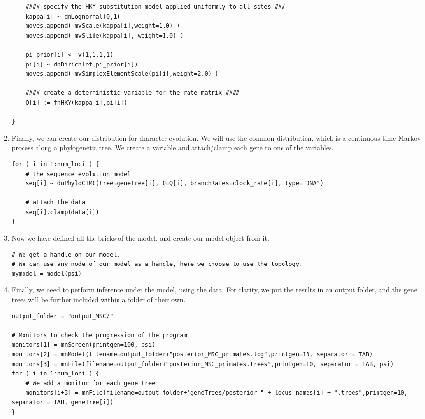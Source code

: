 \begin{enumerate}
{\begin{snugshade*}
\begin{lstlisting}
    #### specify the HKY substitution model applied uniformly to all sites ###
    kappa[i] ~ dnLognormal(0,1)
    moves.append( mvScale(kappa[i],weight=1.0) )
    moves.append( mvSlide(kappa[i], weight=1.0) )

    pi_prior[i] <- v(1,1,1,1)
    pi[i] ~ dnDirichlet(pi_prior[i])
    moves.append( mvSimplexElementScale(pi[i],weight=2.0) )

    #### create a deterministic variable for the rate matrix ####
    Q[i] := fnHKY(kappa[i],pi[i])

}

\end{lstlisting}
\end{snugshade*}}


\item Finally, we can create our distribution for character evolution.
We will use the common  distribution, which is a continuous time Markov process along a phylogenetic tree.
We create a  variable and attach/clamp each gene to one of the  variables.
{\tt \begin{snugshade*}
\begin{lstlisting}
for ( i in 1:num_loci ) {
    # the sequence evolution model
    seq[i] ~ dnPhyloCTMC(tree=geneTree[i], Q=Q[i], branchRates=clock_rate[i], type="DNA")

    # attach the data
    seq[i].clamp(data[i])
}
\end{lstlisting}
\end{snugshade*}}


\item Now we have defined all the bricks of the model, and create our model object from it.
{\tt \begin{snugshade*}
\begin{lstlisting}
# We get a handle on our model.
# We can use any node of our model as a handle, here we choose to use the topology.
mymodel = model(psi)
\end{lstlisting}
\end{snugshade*}}


\item Finally, we need to perform inference under the model, using the data.
For clarity, we put the results in an output folder, and the gene trees will be further included within a folder of their own.
{\tt \begin{snugshade*}
\begin{lstlisting}
output_folder = "output_MSC/"

# Monitors to check the progression of the program
monitors[1] = mnScreen(printgen=100, psi)
monitors[2] = mnModel(filename=output_folder+"posterior_MSC_primates.log",printgen=10, separator = TAB)
monitors[3] = mnFile(filename=output_folder+"posterior_MSC_primates.trees",printgen=10, separator = TAB, psi)
for ( i in 1:num_loci ) {
    # We add a monitor for each gene tree
    monitors[i+3] = mnFile(filename=output_folder+"geneTrees/posterior_" + locus_names[i] + ".trees",printgen=10, separator = TAB, geneTree[i])
}


\end{lstlisting}
\end{snugshade*}}
\end{enumerate}

